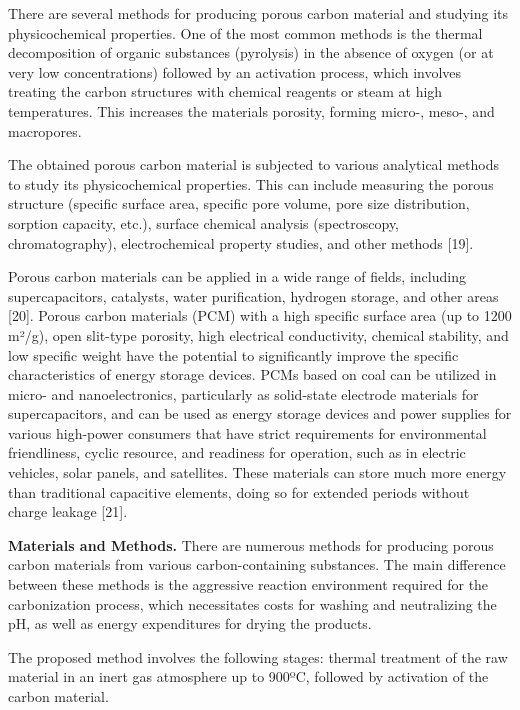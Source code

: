 \begin{multicols}{2}
There are several methods for producing porous carbon material and
studying its physicochemical properties. One of the most common methods
is the thermal decomposition of organic substances (pyrolysis) in the
absence of oxygen (or at very low concentrations) followed by an
activation process, which involves treating the carbon structures with
chemical reagents or steam at high temperatures. This increases the
material\textquotesingle s porosity, forming micro-, meso-, and
macropores.

The obtained porous carbon material is subjected to various analytical
methods to study its physicochemical properties. This can include
measuring the porous structure (specific surface area, specific pore
volume, pore size distribution, sorption capacity, etc.), surface
chemical analysis (spectroscopy, chromatography), electrochemical
property studies, and other methods {[}19{]}.

Porous carbon materials can be applied in a wide range of fields,
including supercapacitors, catalysts, water purification, hydrogen
storage, and other areas {[}20{]}. Porous carbon materials (PCM) with a
high specific surface area (up to 1200 m²/g), open slit-type porosity,
high electrical conductivity, chemical stability, and low specific
weight have the potential to significantly improve the specific
characteristics of energy storage devices. PCMs based on coal can be
utilized in micro- and nanoelectronics, particularly as solid-state
electrode materials for supercapacitors, and can be used as energy
storage devices and power supplies for various high-power consumers that
have strict requirements for environmental friendliness, cyclic
resource, and readiness for operation, such as in electric vehicles,
solar panels, and satellites. These materials can store much more energy
than traditional capacitive elements, doing so for extended periods
without charge leakage {[}21{]}.

{\bfseries Materials and Methods.} There are numerous methods for producing
porous carbon materials from various carbon-containing substances. The
main difference between these methods is the aggressive reaction
environment required for the carbonization process, which necessitates
costs for washing and neutralizing the pH, as well as energy
expenditures for drying the products.

The proposed method involves the following stages: thermal treatment of
the raw material in an inert gas atmosphere up to 900ºC, followed by
activation of the carbon material.


\end{multicols}
